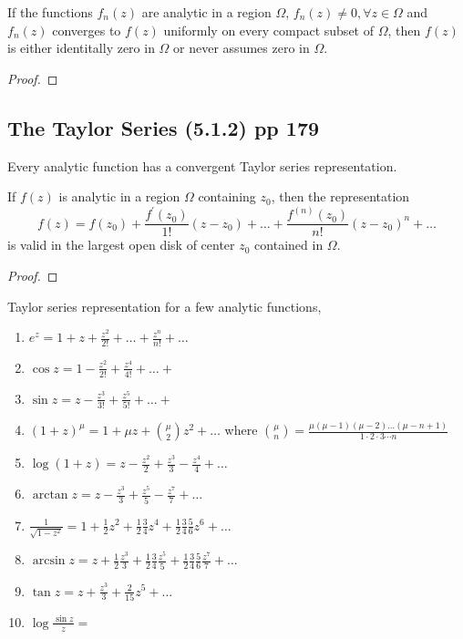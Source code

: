 \begin{theorem}[Hurwitz]
	If the functions $f_n(z)$ are analytic in a region $\Omega$, $f_n(z) \ne 0, \forall z \in \Omega$ and $f_n(z)$ converges to $f(z)$ uniformly on every compact subset of $\Omega$, then $f(z)$ is either identitally zero in $\Omega$ or never assumes zero in $\Omega$.
\end{theorem}
\begin{proof}
\end{proof}
	
\subsection{The Taylor Series (5.1.2) pp 179}
\begin{important}
	Every analytic function has a convergent Taylor series representation.
\end{important}
\begin{theorem}
	If $f(z)$ is analytic in a region $\Omega$ containing $z_0$, then the representation
	\begin{equation}
		f(z) = f(z_0) + \frac{f^\prime(z_0)}{1!}(z-z_0) + \dots + \frac{f^{(n)}(z_0)}{n!}(z-z_0)^n + \dots
	\end{equation}
	is valid in the largest open disk of center $z_0$ contained in $\Omega$.
\end{theorem}
\begin{proof}
\end{proof}

Taylor series representation for a few analytic functions,
\begin{enumerate}
	\item $e^z = 1 + z + \frac{z^2}{2!} + \dots + \frac{z^n}{n!} + \dots$
	\item $\cos z = 1 - \frac{z^2}{2!} + \frac{z^4}{4!} + \dots + $
	\item $\sin z = z - \frac{z^3}{3!} + \frac{z^5}{5!} + \dots + $
	\item $(1+z)^\mu = 1 + \mu z + \binom{\mu}{2} z^2 + \dots$ where $\binom{\mu}{n} = \frac{\mu(\mu-1)(\mu-2)\dots(\mu-n+1)}{1 \cdot 2 \cdot 3 \cdots n}$
	\item $\log (1+z) = z - \frac{z^2}{2} + \frac{z^3}{3} - \frac{z^4}{4} + \dots$
	\item $\arctan z = z - \frac{z^3}{3} + \frac{z^5}{5} - \frac{z^7}{7} + \dots$
	\item $\frac{1}{\sqrt{1-z^2}} = 1 + \frac{1}{2}z^2 + \frac{1}{2}\frac{3}{4} z^4 + \frac{1}{2} \frac{3}{4} \frac{5}{6} z^6 + \dots$ 
	\item $\arcsin z = z + \frac{1}{2} \frac{z^3}{3} + \frac{1}{2} \frac{3}{4} \frac{z^5}{5} + \frac{1}{2} \frac{3}{4} \frac{5}{6} \frac{z^7}{7} + \dots$
	\item $\tan z = z + \frac{z^3}{3}+\frac{2}{15}z^5+\dots$
	\item $\log \frac{\sin z}{z} = $
\end{enumerate}

